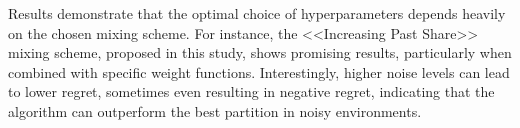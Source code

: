 \documentclass[12pt, twoside]{article}
\begin{document}
Results demonstrate that the optimal choice of hyperparameters depends heavily on the chosen mixing scheme. For instance, the <<Increasing Past Share>> mixing scheme, proposed in this study, shows promising results, particularly when combined with specific weight functions. Interestingly, higher noise levels can lead to lower regret, sometimes even resulting in negative regret, indicating that the algorithm can outperform the best partition in noisy environments.


%
%
%
%

\end{document}

